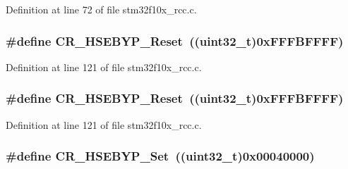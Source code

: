 Definition at line 72 of file stm32f10x\+\_\+rcc.\+c.

\subsubsection[{\texorpdfstring{C\+R\+\_\+\+H\+S\+E\+B\+Y\+P\+\_\+\+Reset}{CR_HSEBYP_Reset}}]{\setlength{\rightskip}{0pt plus 5cm}\#define C\+R\+\_\+\+H\+S\+E\+B\+Y\+P\+\_\+\+Reset~(({\bf uint32\+\_\+t})0x\+F\+F\+F\+B\+F\+F\+F\+F)}\hypertarget{group___r_c_c___private___defines_ga98f5ef520febdb0a1cd8f407f8e5e62f}{}\label{group___r_c_c___private___defines_ga98f5ef520febdb0a1cd8f407f8e5e62f}


Definition at line 121 of file stm32f10x\+\_\+rcc.\+c.

\subsubsection[{\texorpdfstring{C\+R\+\_\+\+H\+S\+E\+B\+Y\+P\+\_\+\+Reset}{CR_HSEBYP_Reset}}]{\setlength{\rightskip}{0pt plus 5cm}\#define C\+R\+\_\+\+H\+S\+E\+B\+Y\+P\+\_\+\+Reset~(({\bf uint32\+\_\+t})0x\+F\+F\+F\+B\+F\+F\+F\+F)}\hypertarget{group___r_c_c___private___defines_ga98f5ef520febdb0a1cd8f407f8e5e62f}{}\label{group___r_c_c___private___defines_ga98f5ef520febdb0a1cd8f407f8e5e62f}


Definition at line 121 of file stm32f10x\+\_\+rcc.\+c.

\subsubsection[{\texorpdfstring{C\+R\+\_\+\+H\+S\+E\+B\+Y\+P\+\_\+\+Set}{CR_HSEBYP_Set}}]{\setlength{\rightskip}{0pt plus 5cm}\#define C\+R\+\_\+\+H\+S\+E\+B\+Y\+P\+\_\+\+Set~(({\bf uint32\+\_\+t})0x00040000)}\hypertarget{group___r_c_c___private___defines_ga84972845ff646ce1d3902d54dd7b9bc6}{}\label{group___r_c_c___private___defines_ga84972845ff646ce1d3902d54dd7b9bc6}


